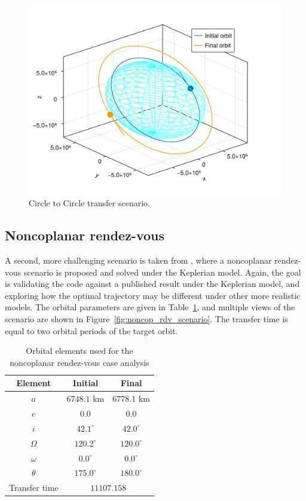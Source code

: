 \begin{figure}[htbp]
    \centering
    \includegraphics{../results/two_body/hohmann/scenario.png}
    \caption{Circle to Circle transfer scenario.}
    \label{fig:hohmann_scenario}
\end{figure}

\subsection{Noncoplanar rendez-vous}

A second, more challenging scenario is taken from , where a noncoplanar rendez-vous scenario is proposed and solved under the Keplerian model. Again, the goal is validating the code against a published result under the Keplerian model, and exploring how the optimal trajectory may be different under other more realistic models. The orbital parameters are given in Table~\ref{tab:noncop_rdv_orb_elems}, and multiple views of the scenario are shown in Figure~\ref{fig:noncop_rdv_scenario}. The transfer time is equal to two orbital periods of the target orbit.

\begin{table}[htbp]
    \centering
    \begin{tabular}{ccc} \toprule
        Element & Initial & Final \\ \midrule
        \(a\)      & \(6748.1\) km         & \(6778.1\) km   \\
        \(e\)      & \(0.0\)            & \(0.0\)        \\
        \(i\)      & \(42.1^\circ\)      & \(42.0^\circ\) \\
        \(\Omega\) & \(120.2^\circ\)   & \(120.0^\circ\)  \\
        \(\omega\) & \(0.0^\circ\)  & \(0.0^\circ\)  \\
        \(\theta\) & \(175.0^\circ\)  & \(180.0^\circ\)  \\ 
        Transfer time & \multicolumn{2}{c}{\(11107.158\)} \\\bottomrule
    \end{tabular}
    \caption{Orbital elements used for the noncoplanar rendez-vous case analysis}
    \label{tab:noncop_rdv_orb_elems}
\end{table}


